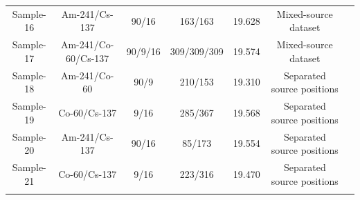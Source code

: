 \documentclass[pdflatex,sn-mathphys-num, table]{sn-jnl}%
\theoremstyle{thmstyleone}%
\theoremstyle{thmstyletwo}%
\theoremstyle{thmstylethree}%
\begin{document}
\begin{table}
\begin{tabular}{ccccccc}
Sample-16   & Am-241/Cs-137 & 90/16 & 163/163 & 19.628 & Mixed-source dataset \\
Sample-17   & Am-241/Co-60/Cs-137  & 90/9/16 & 309/309/309 & 19.574 & Mixed-source dataset \\
Sample-18   & Am-241/Co-60 & 90/9 & 210/153 & 19.310 & Separated source positions \\
Sample-19   & Co-60/Cs-137 & 9/16 & 285/367 & 19.568 & Separated source positions \\
Sample-20   & Am-241/Cs-137 & 90/16 & 85/173 & 19.554 &  Separated source positions \\
Sample-21   & Co-60/Cs-137 & 9/16 & 223/316 & 19.470 & Separated source positions\\
\botrule
\end{tabular}
\end{table}

\clearpage
\end{document}
